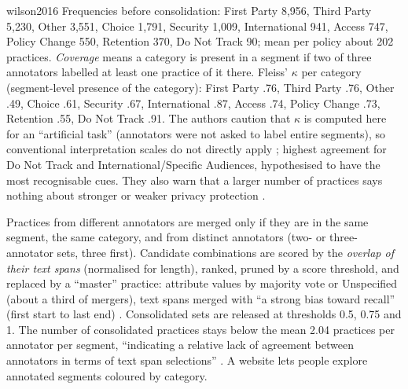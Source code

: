 \begin{papercard}{wilson2016}
 Frequencies before consolidation: First Party 8,956, Third Party 5,230, Other 3,551, Choice 1,791, Security 1,009, International 941, Access 747, Policy Change 550, Retention 370, Do Not Track 90; mean per policy about 202 practices. \emph{Coverage} means a category is present in a segment if two of three annotators labelled at least one practice of it there. Fleiss' $\kappa$ per category (segment-level presence of the category): First Party .76, Third Party .76, Other .49, Choice .61, Security .67, International .87, Access .74, Policy Change .73, Retention .55, Do Not Track .91. The authors caution that $\kappa$ is computed here for an ``artificial task'' (annotators were not asked to label entire segments), so conventional interpretation scales do not directly apply ; highest agreement for Do Not Track and International/Specific Audiences, hypothesised to have the most recognisable cues. They also warn that a larger number of practices says nothing about stronger or weaker privacy protection .

 Practices from different annotators are merged only if they are in the same segment, the same category, and from distinct annotators (two- or three-annotator sets, three first). Candidate combinations are scored by the \emph{overlap of their text spans} (normalised for length), ranked, pruned by a score threshold, and replaced by a ``master'' practice: attribute values by majority vote or Unspecified (about a third of mergers), text spans merged with ``a strong bias toward recall'' (first start to last end) . Consolidated sets are released at thresholds 0.5, 0.75 and 1. The number of consolidated practices stays below the mean 2.04 practices per annotator per segment, ``indicating a relative lack of agreement between annotators in terms of text span selections'' . A website lets people explore annotated segments coloured by category.


\end{papercard}
